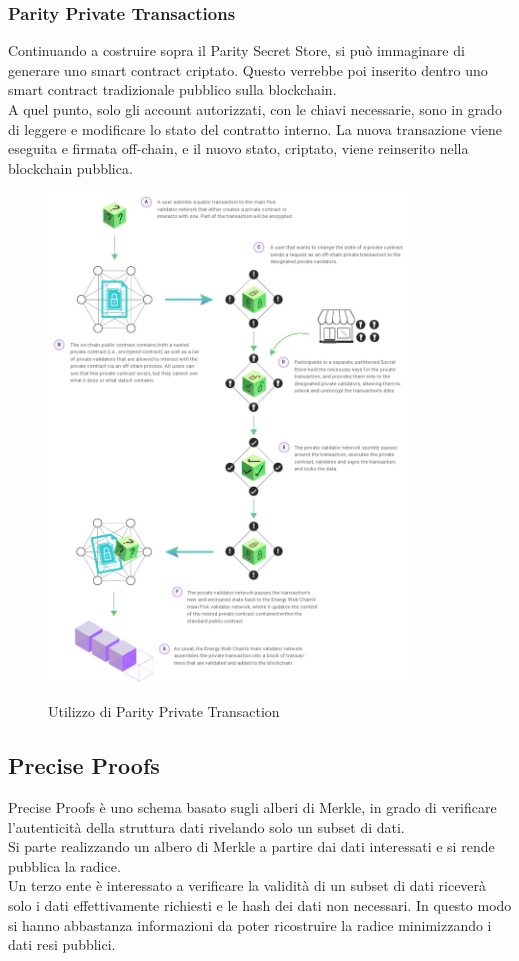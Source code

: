 \documentclass[12pt, letterpaper, twoside]{article}
\begin{document}
\subsubsection{Parity Private Transactions}
Continuando a costruire sopra il Parity Secret Store, si può immaginare di generare uno smart contract criptato.
Questo verrebbe poi inserito dentro uno smart contract tradizionale pubblico sulla blockchain. \\
A quel punto, solo gli account autorizzati, con le chiavi necessarie, sono in grado di leggere e modificare lo stato del contratto interno.
La nuova transazione viene eseguita e firmata off-chain, e il nuovo stato, criptato, viene reinserito nella blockchain pubblica.
 
\begin{figure}[h]
    \includegraphics[height=13cm,keepaspectratio]{ew-privacy}
    \centering
    \label{ew-privacy}
    \caption{Utilizzo di Parity Private Transaction \cite{img:ew-privacy}}
\end{figure}

\subsection{Precise Proofs}
Precise Proofs è uno schema basato sugli alberi di Merkle, in grado di verificare l'autenticità della struttura dati rivelando solo un subset di dati. \\
Si parte realizzando un albero di Merkle a partire dai dati interessati e si rende pubblica la radice. \\
Un terzo ente è interessato a verificare la validità di un subset di dati riceverà solo i dati effettivamente richiesti e le hash dei dati non necessari.
In questo modo si hanno abbastanza informazioni da poter ricostruire la radice minimizzando i dati resi pubblici.
 
\end{document}
